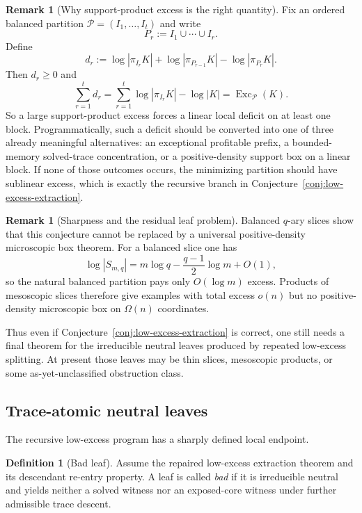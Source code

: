\documentclass[11pt]{article}
\theoremstyle{definition}
\newtheorem{definition}[theorem]{Definition}
\newtheorem{remark}[theorem]{Remark}
\newcommand{\1}{\mathbf{1}}
\begin{document}
\begin{remark}[Why support-product excess is the right quantity]\label{rem:low-excess-telescoping}
Fix an ordered balanced partition $\mathcal P=(I_1,\dots,I_t)$ and write
\[
P_r:=I_1\cup\cdots\cup I_r.
\]
Define
\[
d_r:=\log |\pi_{I_r}K|+\log |\pi_{P_{r-1}}K|-\log |\pi_{P_r}K|.
\]
Then $d_r\ge 0$ and
\[
\sum_{r=1}^t d_r
=
\sum_{r=1}^t \log |\pi_{I_r}K|-\log |K|
=
\operatorname{Exc}_{\mathcal P}(K).
\]
So a large support-product excess forces a linear local deficit on at least one block.
Programmatically, such a deficit should be converted into one of three already meaningful alternatives:
an exceptional profitable prefix, a bounded-memory solved-trace concentration, or a positive-density support box on a linear block.
If none of those outcomes occurs, the minimizing partition should have sublinear excess, which is exactly the recursive branch in Conjecture~\ref{conj:low-excess-extraction}.
\end{remark}

\begin{remark}[Sharpness and the residual leaf problem]\label{rem:low-excess-sharpness}
Balanced $q$-ary slices show that this conjecture cannot be replaced by a universal positive-density microscopic box theorem.
For a balanced slice one has
\[
\log |S_{m,q}|=m\log q-\frac{q-1}{2}\log m+O(1),
\]
so the natural balanced partition pays only $O(\log m)$ excess.
Products of mesoscopic slices therefore give examples with total excess $o(n)$ but no positive-density microscopic box on $\Omega(n)$ coordinates.

Thus even if Conjecture~\ref{conj:low-excess-extraction} is correct, one still needs a final theorem for the irreducible neutral leaves produced by repeated low-excess splitting.
At present those leaves may be thin slices, mesoscopic products, or some as-yet-unclassified obstruction class.
\end{remark}

\subsection*{Trace-atomic neutral leaves}
The recursive low-excess program has a sharply defined local endpoint.

\begin{definition}[Bad leaf]\label{def:bad-leaf}
Assume the repaired low-excess extraction theorem and its descendant re-entry property.
A leaf is called \emph{bad} if it is irreducible neutral and yields neither a solved witness nor an exposed-core witness under further admissible trace descent.
\end{definition}
\end{document}
